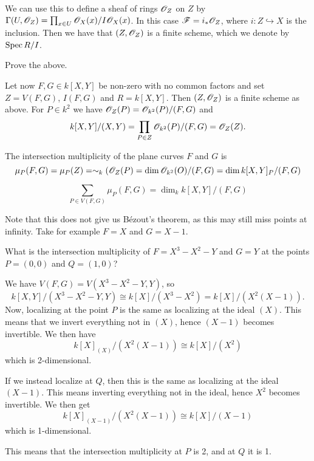 We can use this to define a sheaf of rings $\mathscr{O}_Z$ on $Z$ by $\Gamma(U, \mathscr{O}_Z) = \prod_{x\in U} \mathscr{O}_X(x)/I\mathscr{O}_X(x)$. In this case $\mathscr{F}=i_*\mathscr{O}_Z$, where $i\colon Z\hookrightarrow X$ is the inclusion. Then we have that $(Z, \mathscr{O}_Z)$ is a finite scheme, which we denote by $\operatorname{Spec} R/I$. 

\begin{problem}
Prove the above.
\end{problem}

Let now $F, G\in k[X, Y]$ be non-zero with no common factors and set $Z=V(F, G)$, $I(F, G)$ and $R=k[X, Y]$. Then $(Z, \mathscr{O}_Z)$ is a finite scheme as above. For $P\in k^2$ we have $\mathscr{O}_Z(P) = \mathscr{O}_{k^2}(P)/(F, G)$ and 
\begin{equation*}
    k[X, Y]/(X, Y) = \prod_{P\in Z}\mathscr{O}_{k^2}(P)/(F, G) = \mathscr{O}_Z(Z).
\end{equation*}

\begin{definition}
The intersection multiplicity of the plane curves $F$ and $G$ is 
\begin{equation*}
    \mu_P(F, G)=\mu_P(Z)=\sim_k(\mathscr{O}_Z(P)=\dim \mathscr{O}_{k^2}(O)/(F, G) = \dim k[X, Y]_P/(F, G)
\end{equation*}
\end{definition}

\begin{corollary}
\begin{equation*}
    \sum_{P\in V(F, G)}\mu_P(F, G) = \dim_k k[X, Y]/(F,G)
\end{equation*}
\end{corollary}

Note that this does not give us Bézout's theorem, as this may still miss points at infinity. Take for example $F=X$ and $G=X-1$. 

\begin{problem}
What is the intersection multiplicity of $F=X^3-X^2-Y$ and $G=Y$ at the points $P=(0,0)$ and $Q=(1,0)$?
\end{problem}
\begin{solution}
We have $V(F, G)=V(X^3-X^2-Y, Y)$, so
\begin{equation*}
    k[X, Y]/(X^3-X^2-Y, Y)\cong k[X]/(X^3-X^2)=k[X]/(X^2(X-1)).
\end{equation*}
Now, localizing at the point $P$ is the same as localizing at the ideal $(X)$. This means that we invert everything not in $(X)$, hence $(X-1)$ becomes invertible. We then have
\begin{equation*}
    k[X]_{(X)}/(X^2(X-1))\cong k[X]/(X^2)
\end{equation*}
which is 2-dimensional.

If we instead localize at $Q$, then this is the same as localizing at the ideal $(X-1)$. This means inverting everything not in the ideal, hence $X^2$ becomes invertible. We then get 
\begin{equation*}
    k[X]_{(X-1)}/(X^2(X-1))\cong k[X]/(X-1)
\end{equation*}
which is 1-dimensional. 

This means that the intersection multiplicity at $P$ is 2, and at $Q$ it is 1. 
\end{solution}

